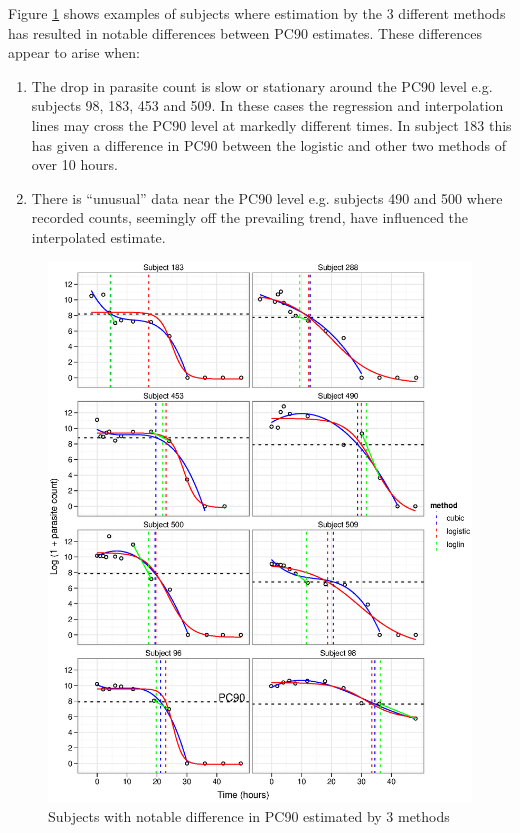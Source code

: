 Figure \ref{pc90-bad} shows examples of subjects where estimation by the 3 different methods has resulted in notable differences between PC90 estimates. These differences appear to arise when:
\begin{enumerate}
\item The drop in parasite count is slow or stationary around the PC90 level e.g. subjects 98, 183, 453 and 509. In these cases the regression and interpolation lines may cross the PC90 level at markedly different times. In subject 183 this has given a difference in PC90 between the logistic and other two methods of over 10 hours.
\item There is ``unusual'' data near the PC90 level e.g. subjects 490 and 500 where recorded counts, seemingly off the prevailing trend, have influenced the interpolated estimate.
\end{enumerate}
\begin{figure}[p]
\includegraphics[width=150mm]{pc90-bad.eps} 
\caption{Subjects with notable difference in PC90 estimated by 3 methods}
\label{pc90-bad}
\end{figure}
